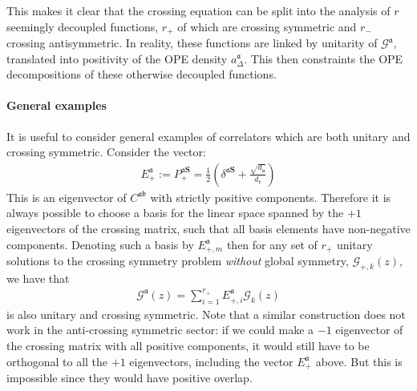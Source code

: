 \documentclass[12pt]{article}
\numberwithin{equation}{section}
\newcommand{\bea}{\begin{eqnarray}}
\newcommand{\eea}{\end{eqnarray}}
\newcommand{\ba}{\begin{equation}\begin{aligned}}
\newcommand{\ea}{\end{aligned}\end{equation}}
\newcommand{\mbf}{\mathbf}
\newcommand{\mf}[1]{\mathfrak #1}
\begin{document}
	This makes it clear that the crossing equation can be split into the analysis of $r$ seemingly decoupled functions, $r_+$ of which are crossing symmetric and $r_-$ crossing antisymmetric. In reality, these functions are linked by unitarity of $\mathcal G^{\mf a}$, translated into positivity of the OPE density $a^{\mf a}_{\Delta}$. This then constraints the OPE decompositions of these otherwise decoupled functions.
	
	\paragraph{General examples}
	
	It is useful to consider general examples of correlators which are both unitary and crossing symmetric. Consider the vector:
	\ba
	E_{+}^{\mf a}:=P_{+}^{\mf a \mbf S}=\frac 12\left(\delta^{\mf a\mbf S}+\frac{\sqrt{d_{\mf a}}}{d_{\mf r}}\right) \label{eq:allposguy}
	\ea
	This is an eigenvector of $C^{\mf a \mf b}$ with strictly positive components. Therefore it is always possible to choose a basis for the linear space spanned by the $+1$ eigenvectors of the crossing matrix, such that all basis elements have non-negative  components. Denoting such a basis by $E_{+,m}^{\mf a}$ then for any set of $r_+$ unitary solutions to the crossing symmetry problem {\em without} global symmetry, $\mathcal G_{+,k}(z)$, we have that
	\bea
	\mathcal G^{\mf a}(z)=\sum_{i=1}^{r_+} E_{+,i}^{\mf a} \mathcal G_k(z) \label{eq:sumsolution}
	\eea
	is also unitary and crossing symmetric. Note that a similar construction does not work in the anti-crossing symmetric sector: if we could make a $-1$ eigenvector of the crossing matrix with all positive components, it would still have to be orthogonal to all the $+1$ eigenvectors, including the vector $E_+^{\mf a}$ above. But this is impossible since they would have positive overlap.
	
\end{document}
